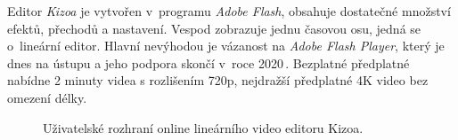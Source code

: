 Editor \textit{Kizoa} je vytvořen v~programu \textit{Adobe Flash}, obsahuje dostatečné množství efektů, přechodů a nastavení. Vespod zobrazuje jednu časovou osu, jedná se o~lineární editor. Hlavní nevýhodou je vázanost na \textit{Adobe Flash Player}, který je dnes na ústupu a jeho podpora skončí v~roce 2020\,\cite{FlashPlayer}. Bezplatné předplatné nabídne 2 minuty videa s rozlišením 720p, nejdražší předplatné 4K video bez omezení délky.
\begin{figure}[h]
	\centering
	\caption{Uživatelské rozhraní online lineárního video editoru Kizoa.}\label{img:kizoa}
\end{figure}

